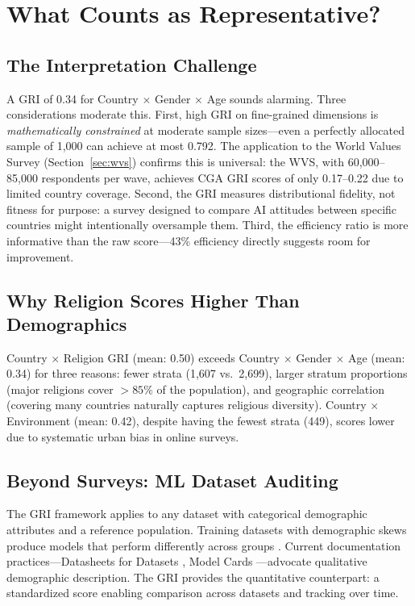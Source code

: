 \documentclass[11pt,a4paper]{article}
\begin{document}
\section{What Counts as Representative?}

\subsection{The Interpretation Challenge}

A GRI of 0.34 for Country $\times$ Gender $\times$ Age sounds alarming. Three considerations moderate this. First, high GRI on fine-grained dimensions is \emph{mathematically constrained} at moderate sample sizes---even a perfectly allocated sample of 1,000 can achieve at most 0.792. The application to the World Values Survey (Section~\ref{sec:wvs}) confirms this is universal: the WVS, with 60,000--85,000 respondents per wave, achieves CGA GRI scores of only 0.17--0.22 due to limited country coverage. Second, the GRI measures distributional fidelity, not fitness for purpose: a survey designed to compare AI attitudes between specific countries might intentionally oversample them. Third, the efficiency ratio is more informative than the raw score---43\% efficiency directly suggests room for improvement.

\subsection{Why Religion Scores Higher Than Demographics}

Country $\times$ Religion GRI (mean: 0.50) exceeds Country $\times$ Gender $\times$ Age (mean: 0.34) for three reasons: fewer strata (1,607 vs.\ 2,699), larger stratum proportions (major religions cover $>85\%$ of the population), and geographic correlation (covering many countries naturally captures religious diversity). Country $\times$ Environment (mean: 0.42), despite having the fewest strata (449), scores lower due to systematic urban bias in online surveys.

\subsection{Beyond Surveys: ML Dataset Auditing}

The GRI framework applies to any dataset with categorical demographic attributes and a reference population. Training datasets with demographic skews produce models that perform differently across groups \citep{buolamwini2018gender}. Current documentation practices---Datasheets for Datasets \citep{gebru2021datasheets}, Model Cards \citep{mitchell2019model}---advocate qualitative demographic description. The GRI provides the quantitative counterpart: a standardized score enabling comparison across datasets and tracking over time.
\end{document}
